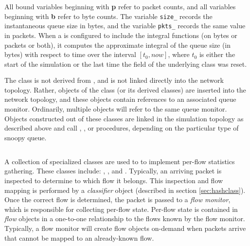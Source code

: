 All bound variables beginning with {\bf p} refer to packet counts, and
all variables beginning with {\bf b} refer to byte counts.
The variable {\tt size\_} records the instantaneous queue size in bytes,
and the variable {\tt pkts\_} records the same value in packets.
When a  is configured to include the integral
functions (on bytes or packets or both), it
computes the approximate integral of the
queue size (in bytes)
with respect to time over the interval $[t_0, now]$, where
$t_0$ is either the start of the simulation or the last time the
 field of the underlying  class was reset.

The  class is not derived from , and
is not linked directly into the network topology.
Rather, objects of the  class (or its derived classes)
are inserted into the network topology, and these objects contain references
to an associated queue monitor.
Ordinarily, multiple  objects will refer to the same
queue monitor.
Objects constructed out of these classes are linked in the simulation
topology as described above and call 
, , or  procedures,
depending on the particular type of snoopy queue.

\subsection{}

A collection of specialized classes are used to to implement
per-flow statistics gathering.
These classes include: ,
, and .
Typically, an arriving packet is inspected to determine
to which flow it belongs.
This inspection and flow mapping is performed by a {\em classifier}
object (described in section \ref{sec:hashclass}).
Once the correct flow is determined, the packet is passed to
a {\em flow monitor}, which is responsible for collecting per-flow
state.
Per-flow state is contained in {\em flow} objects in a one-to-one
relationship to the flows known by the flow monitor.
Typically, a flow monitor will create flow objects on-demand when
packets arrive that cannot be mapped to an already-known flow.

\subsubsection{}

